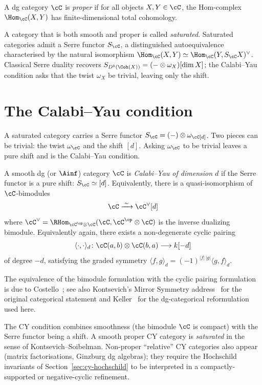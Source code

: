 \begin{definition}
\label{def:proper-dg-cat}
A dg category $\cC$ is \emph{proper} if for all objects $X, Y \in \cC$, the Hom-complex $\Hom_\cC(X,Y)$ has finite-dimensional total cohomology.
\end{definition}

A category that is both smooth and proper is called \emph{saturated}. Saturated categories admit a Serre functor $S_\cC$, a distinguished autoequivalence characterised by the natural isomorphism $\Hom_\cC(X, Y) \simeq \Hom_\cC(Y, S_\cC X)^\vee$. Classical Serre duality recovers $S_{D^b(\Coh(X))} = (- \otimes \omega_X)[\dim X]$; the Calabi--Yau condition asks that the twist $\omega_X$ be trivial, leaving only the shift.

\section{The Calabi--Yau condition}
\label{sec:cy-condition}

A saturated category carries a Serre functor $S_\cC = (-)\otimes\omega_\cC[d]$.
Two pieces can be trivial: the twist $\omega_\cC$ and the shift $[d]$. Asking
$\omega_\cC$ to be trivial leaves a pure shift and is the Calabi--Yau condition.

\begin{definition}
\label{def:cy-category}
A smooth dg (or $\Ainf$) category $\cC$ is \emph{Calabi--Yau of dimension $d$} if the Serre functor is a pure shift: $S_\cC \simeq [d]$. Equivalently, there is a quasi-isomorphism of $\cC$-bimodules
\[
 \cC \xrightarrow{\;\sim\;} \cC^\vee[d]
\]
where $\cC^\vee = \RHom_{\cC^{\op} \otimes \cC}(\cC, \cC^{\op} \otimes \cC)$ is the inverse dualizing bimodule. Equivalently again, there exists a non-degenerate cyclic pairing
\[
 \langle \cdot, \cdot \rangle_d \colon \cC(a, b) \otimes \cC(b, a) \longrightarrow k[-d]
\]
of degree $-d$, satisfying the graded symmetry $\langle f, g \rangle_d = (-1)^{|f|\,|g|} \langle g, f \rangle_d$.
\end{definition}

The equivalence of the bimodule formulation with the cyclic pairing formulation is due to Costello~\cite{Costello2005}; see also Kontsevich's Mirror Symmetry address~\cite{Kontsevich1994} for the original categorical statement and Keller~\cite{Keller2006} for the dg-categorical reformulation used here.

\begin{remark}
\label{rem:cy-vs-smooth-cy}
The CY condition combines smoothness (the bimodule $\cC$ is compact) with the Serre functor being a shift. A smooth proper CY category is \emph{saturated} in the sense of Kontsevich--Soibelman. Non-proper ``relative'' CY categories also appear (matrix factorisations, Ginzburg dg algebras); they require the Hochschild invariants of Section~\ref{sec:cy-hochschild} to be interpreted in a compactly-supported or negative-cyclic refinement.
\end{remark}

